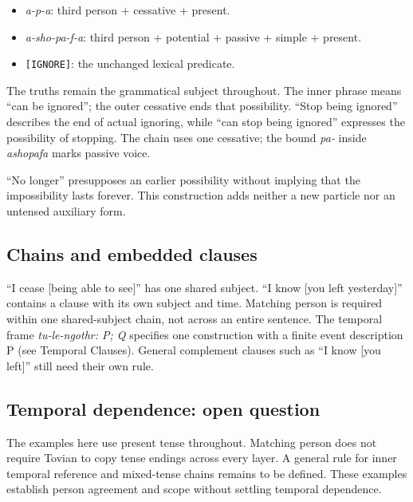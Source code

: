 \begin{itemize}
\item \textit{a-p-a}: third person + cessative + present.
\item \textit{a-sho-pa-f-a}: third person + potential + passive + simple + present.
\item \texttt{[IGNORE]}: the unchanged lexical predicate.
\end{itemize}

The truths remain the grammatical subject throughout. The inner phrase means ``can be ignored''; the outer cessative ends that possibility. ``Stop being ignored'' describes the end of actual ignoring, while ``can stop being ignored'' expresses the possibility of stopping. The chain uses one cessative; the bound \textit{pa-} inside \textit{ashopafa} marks passive voice.

``No longer'' presupposes an earlier possibility without implying that the impossibility lasts forever. This construction adds neither a new particle nor an untensed auxiliary form.

\subsection*{Chains and embedded clauses}

``I cease [being able to see]'' has one shared subject. ``I know [you left yesterday]'' contains a clause with its own subject and time. Matching person is required within one shared-subject chain, not across an entire sentence. The temporal frame \textit{tu-le-ngothr: P; Q} specifies one construction with a finite event description P (see Temporal Clauses). General complement clauses such as ``I know [you left]'' still need their own rule.

\subsection*{Temporal dependence: open question}

The examples here use present tense throughout. Matching person does not require Tovian to copy tense endings across every layer. A general rule for inner temporal reference and mixed-tense chains remains to be defined. These examples establish person agreement and scope without settling temporal dependence.
